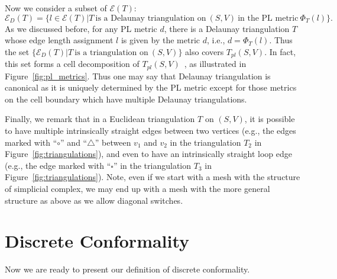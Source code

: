 \documentclass[11pt]{article}
\begin{document}
Now we consider a subset of $\mathcal{E}(T)$:
\begin{equation}
\mathcal{E}_D(T) = \{l \in \mathcal{E}(T) | T ~\text{is a Delaunay triangulation on}~(S, V)~\text{in the PL metric}~\Phi_T(l)\}. 
\end{equation}
As we discussed before, for any PL metric $d$, there is a Delaunay triangulation $T$ whose edge length assignment $l$
is given by the metric $d$, i.e., $d = \Phi_T(l)$. 
Thus the set $\{\mathcal{E}_D(T)|  T~\text{is a triangulation on}~(S, V)\}$ also covers $T_{pl}(S, V)$. 
In fact, this set forms a cell decomposition of $T_{pl}(S, V)$~\cite{rivin, glsw1}, as illustrated in Figure~\ref{fig:pl_metrics}.
Thus one may say that Delaunay triangulation is canonical as it is uniquely determined by the PL metric except 
for those metrics on the cell boundary which have multiple Delaunay triangulations.


Finally, we remark that in a Euclidean triangulation $T$ on $(S, V)$, it is possible to have multiple intrinsically 
straight edges between two vertices (e.g., the edges marked with ``$\circ$'' and ``$\triangle$'' between 
$v_1$ and $v_2$ in the triangulation $T_2$ in Figure~\ref{fig:triangulations}), 
and even to have an intrinsically straight loop edge (e.g., the edge marked with ``$\square$'' in the 
triangulation $T_3$ in Figure~\ref{fig:triangulations}). Note, even if we start with a mesh 
with the structure of simplicial complex, we may end up with a mesh
with the more general structure as above as we allow diagonal switches. 

\section{Discrete Conformality}
Now we are ready to present our definition of discrete conformality. 
\end{document}

